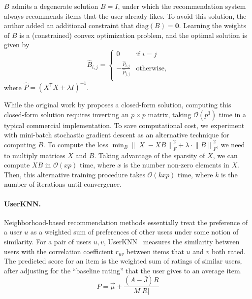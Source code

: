 \documentclass{article}
\DeclareMathOperator{\X}{\mathit{X}}
\newcommand{\userknn}{UserKNN\xspace}
\newcommand{\norm}[1]{\ensuremath{\lVert #1 \rVert}}
\newcommand{\transpose}[1]{{#1}^\mathsf{T}}
\begin{document}
$B$ admits a degenerate solution $B = I$, under which the
recommendation system always recommends items that the user
already likes.
To avoid this solution, the author added an additional constraint that
 $\mathrm{diag}(B) = \mathbf{0}$.
Learning the weights of $B$ is a (constrained) convex optimization problem, and
 the optimal solution is given by  \begin{equation} \hat{B}_{i, j} =
	 \begin{cases} 0 & \text{if $i = j$} \\ -\frac{\hat{P}_{i, j}}{\hat{P}_{j, j}} &
               \text{otherwise,}     \\\end{cases} \end{equation} where $\hat{P} =
	 (\transpose{X} X + \lambda I)^{-1}$.

While the original work by \citet{steckEmbarrassinglyShallowAutoencoders2019}
 proposes a closed-form solution, computing this closed-form solution requires
 inverting an $p \times p$ matrix, taking $\mathcal{O}(p^3)$ time in a typical
 commercial implementation.
To save computational cost, we experiment with mini-batch stochastic gradient
 descent as an alternative technique for computing $B$.
To compute the loss $\min_B \norm{\X - X B}_F^2 + \lambda \cdot \norm{B}_F^2$,
 we need to multiply matrices $X$ and $B$.
Taking advantage of the sparsity of $X$, we can compute $X B$ in $\mathcal{O}(x
	 p)$ time, where $x$ is the number non-zero elements in $X$.
Then, this alternative training procedure takes $\mathcal{O}(kxp)$ time, where
 $k$ is the number of iterations until convergence.

\paragraph*{\userknn.}
Neighborhood-based recommendation methods essentially treat the preference of a
 user $u$ as a weighted sum of preferences of other users under some notion of
 similarity.
For a pair of users $u, v$,
 \userknn~\citep{resnickGroupLensOpenArchitecture1994} measures the similarity
 between users with the correlation coefficient $r_{uv}$ between items that $u$
 and $v$ both rated.
The predicted score for an item is the weighted sum of ratings of similar
 users, after adjusting for the ``baseline rating'' that the user gives to an
 average item.
 \begin{equation}
 P = \vec{\mu} + \frac{(A - \bar J)R}{M|R|}
 \end{equation}
\end{document}
